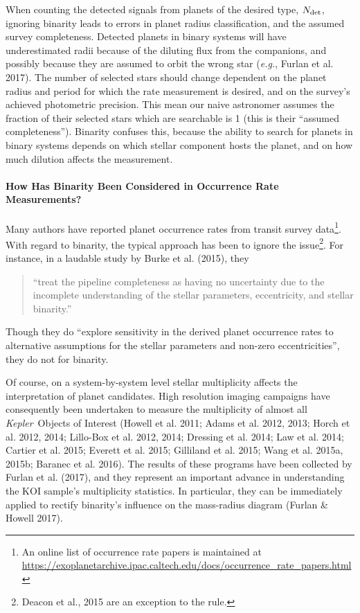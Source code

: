 When counting the detected signals from planets of the desired 
type, $N_{\rm det}$, ignoring binarity leads to errors in planet radius 
classification, and the assumed survey completeness.
Detected planets in binary systems will have underestimated radii because of 
the diluting flux from the companions, and possibly because they are assumed 
to orbit the wrong star ({\it e.g.}, Furlan et al. 2017).
The number of selected stars should change dependent on the planet radius 
and period for which the rate measurement is desired, and on the survey's 
achieved photometric precision.
This mean our naive astronomer assumes the fraction of their selected stars 
which are searchable is 1 (this is their ``assumed completeness'').
Binarity confuses this, because the ability to search for planets 
in binary systems depends on which stellar component hosts the planet, and on 
how much dilution affects the measurement.

\paragraph{How Has Binarity Been Considered in Occurrence Rate Measurements?}
Many authors have reported planet occurrence rates from transit 
survey data\footnote{
    An online list of occurrence rate papers is maintained at 
    \url{https://exoplanetarchive.ipac.caltech.edu/docs/occurrence_rate_papers.html}
}.
With regard to binarity, the typical approach has been to ignore the 
issue\footnote{Deacon et al., 2015 are an exception to the rule.}.
For instance, in a laudable study by Burke et al. (2015), they
\begin{quote}
``treat the pipeline completeness as having no uncertainty 
due to the incomplete understanding of the stellar parameters, eccentricity, 
and stellar binarity.''
\end{quote}
Though they do ``explore sensitivity in the derived planet occurrence rates 
to alternative assumptions for the stellar parameters and non-zero 
eccentricities'', they do not for binarity.

Of course, on a system-by-system level stellar multiplicity affects the 
interpretation of planet candidates. High resolution imaging 
campaigns have consequently been undertaken to measure the multiplicity of 
almost all {\it Kepler}\ Objects of Interest 
(Howell et al. 2011; Adams et al. 2012, 2013; Horch et al. 2012, 2014; 
Lillo-Box et al. 2012, 2014; Dressing et al. 2014; Law et al. 2014; Cartier et 
al. 2015; Everett et al. 2015; Gilliland et al. 2015; Wang et al. 2015a, 
2015b; Baranec et al. 2016).
The results of these programs have been collected by Furlan et al. 
(2017), and they represent an important advance in understanding the KOI 
sample's multiplicity statistics.
In particular, they can be immediately applied to rectify binarity's influence 
on the mass-radius diagram (Furlan \& Howell 2017).

